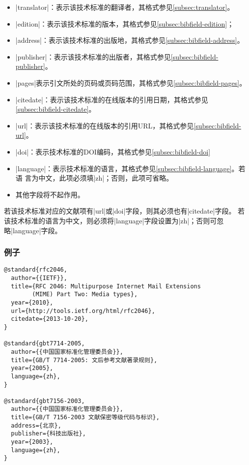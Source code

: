 \begin{itemize}
\item |translator|：表示该技术标准的翻译者，其格式参见\ref{subsec:translator}。
\item |edition|：表示该技术标准的版本，其格式参见\ref{subsec:bibfield-edition}；
\item |address|：表示该技术标准的出版地，其格式参见\ref{subsec:bibfield-address}。
\item |publisher|：表示该技术标准的出版者，其格式参见\ref{subsec:bibfield-publisher}。
\item |pages|表示引文所处的页码或页码范围，其格式参见\ref{subsec:bibfield-pages}。
\item |citedate|：表示该技术标准的在线版本的引用日期，其格式参见\ref{subsec:bibfield-citedate}。
\item |url|：表示该技术标准的在线版本的引用URL，其格式参见\ref{subsec:bibfield-url}。
\item |doi|：表示技术标准的DOI编码，其格式参见\ref{subsec:bibfield-doi}
\item |language|：表示技术标准的语言，其格式参见\ref{subsec:bibfield-language}。若语
  言为中文，此项必须填|zh|；否则，此项可省略。
\item 其他字段将不起作用。
\end{itemize}


\begin{note}
若该技术标准对应的文献项有|url|或|doi|字段，则其必须也有|citedate|字段。
若该技术标准的语言为中文，则必须将|language|字段设置为|zh|；否则可忽略|language|字段。
\end{note}

\subsubsection{例子}

\begin{verbatim}
@standard{rfc2046,
  author={{IETF}},
  title={RFC 2046: Multipurpose Internet Mail Extensions 
        (MIME) Part Two: Media types},
  year={2010},
  url={http://tools.ietf.org/html/rfc2046},
  citedate={2013-10-20},
}

@standard{gbt7714-2005,
  author={{中国国家标准化管理委员会}},
  title={GB/T 7714-2005: 文后参考文献著录规则},
  year={2005},
  language={zh},
}

@standard{gbt7156-2003,
  author={{中国国家标准化管理委员会}},
  title={GB/T 7156-2003 文献保密等级代码与标识},
  address={北京},
  publisher={科技出版社},
  year={2003},
  language={zh},
}
\end{verbatim}

